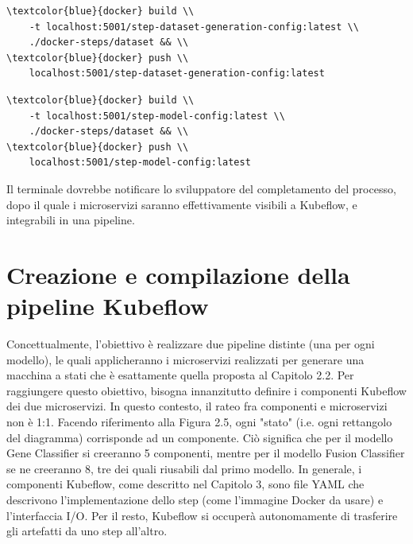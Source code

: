 \begin{small}
\begin{Verbatim}[commandchars=\\\{\}]
\textcolor{blue}{docker} build \\
    -t localhost:5001/step-dataset-generation-config:latest \\
    ./docker-steps/dataset && \\
\textcolor{blue}{docker} push \\
    localhost:5001/step-dataset-generation-config:latest
\end{Verbatim}
\end{small}

\begin{small}
\begin{Verbatim}[commandchars=\\\{\}]
\textcolor{blue}{docker} build \\
    -t localhost:5001/step-model-config:latest \\
    ./docker-steps/dataset && \\
\textcolor{blue}{docker} push \\
    localhost:5001/step-model-config:latest
\end{Verbatim}
\end{small}

Il terminale dovrebbe notificare lo sviluppatore del completamento del processo, dopo il quale i microservizi saranno effettivamente visibili a Kubeflow, e integrabili in una pipeline.

\section{Creazione e compilazione della pipeline Kubeflow}

Concettualmente, l'obiettivo è realizzare due pipeline distinte (una per ogni modello), le quali applicheranno i microservizi realizzati per generare una macchina a stati che è esattamente quella proposta al Capitolo 2.2. Per raggiungere questo obiettivo, bisogna innanzitutto definire i componenti Kubeflow dei due microservizi. In questo contesto, il rateo fra componenti e microservizi non è 1:1. Facendo riferimento alla Figura 2.5, ogni "stato" (i.e. ogni rettangolo del diagramma) corrisponde ad un componente. Ciò significa che per il modello Gene Classifier si creeranno 5 componenti, mentre per il modello Fusion Classifier se ne creeranno 8, tre dei quali riusabili dal primo modello. In generale, i componenti Kubeflow, come descritto nel Capitolo 3, sono file YAML che descrivono l'implementazione dello step (come l'immagine Docker da usare) e l'interfaccia I/O. Per il resto, Kubeflow si occuperà autonomamente di trasferire gli artefatti da uno step all'altro.

